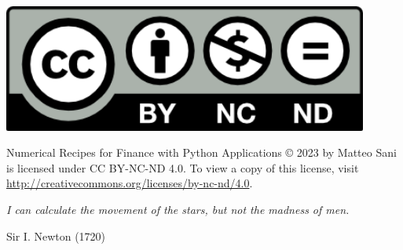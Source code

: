 \thispagestyle{empty}
\vspace*{\fill}
\begin{minipage}{0.25\textwidth}
\includegraphics[width=0.9\textwidth]{figures/by-nc-nd}
\end{minipage}
\begin{minipage}{0.75\textwidth}
Numerical Recipes for Finance with Python Applications © 2023 by Matteo Sani is licensed under CC BY-NC-ND 4.0. To view a copy of this license, visit \href{http://creativecommons.org/licenses/by-nc-nd/4.0}{http://creativecommons.org/licenses/by-nc-nd/4.0}.
\end{minipage}
\clearpage
\thispagestyle{empty}
\null
\vspace{4cm}
\epigraph{\itshape\myopeningquote
I can calculate the movement of the stars, but not the madness of men.\myclosingquote}
{Sir I. Newton (1720)}
\clearpage
\thispagestyle{empty}
\null
\thispagestyle{empty}
